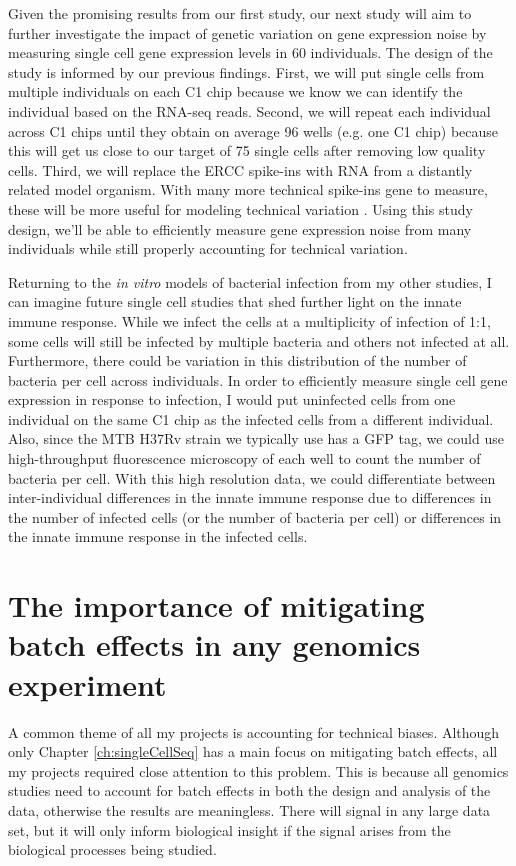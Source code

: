 Given the promising results from our first study, our next study will
aim to further investigate the impact of genetic variation on gene
expression noise by measuring single cell gene expression levels in 60
individuals. The design of the study is informed by our previous
findings. First, we will put single cells from multiple individuals on
each C1 chip because we know we can identify the individual based on
the RNA-seq reads. Second, we will repeat each individual across C1
chips until they obtain on average 96 wells (e.g. one C1 chip) because
this will get us close to our target of 75 single cells after removing
low quality cells. Third, we will replace the ERCC spike-ins with RNA
from a distantly related model organism. With many more technical
spike-ins gene to measure, these will be more useful for modeling
technical variation \citep{Risso2014}. Using this study design, we’ll
be able to efficiently measure gene expression noise from many
individuals while still properly accounting for technical variation.

Returning to the \emph{in vitro} models of bacterial infection from my
other studies, I can imagine future single cell studies that shed
further light on the innate immune response. While we infect the cells
at a multiplicity of infection of 1:1, some cells will still be
infected by multiple bacteria and others not infected at
all. Furthermore, there could be variation in this distribution of the
number of bacteria per cell across individuals. In order to
efficiently measure single cell gene expression in response to
infection, I would put uninfected cells from one individual on the
same C1 chip as the infected cells from a different individual. Also,
since the MTB H37Rv strain we typically use has a GFP tag, we could
use high-throughput fluorescence microscopy of each well to count the
number of bacteria per cell. With this high resolution data, we could
differentiate between inter-individual differences in the innate
immune response due to differences in the number of infected cells (or
the number of bacteria per cell) or differences in the innate immune
response in the infected cells.

\section{The importance of mitigating batch effects in any genomics experiment}

A common theme of all my projects is accounting for technical
biases. Although only Chapter \ref{ch:singleCellSeq} has a main focus
on mitigating batch effects, all my projects required close attention
to this problem. This is because all genomics studies need to account
for batch effects in both the design and analysis of the data,
otherwise the results are meaningless. There will signal in any large
data set, but it will only inform biological insight if the signal
arises from the biological processes being studied.

